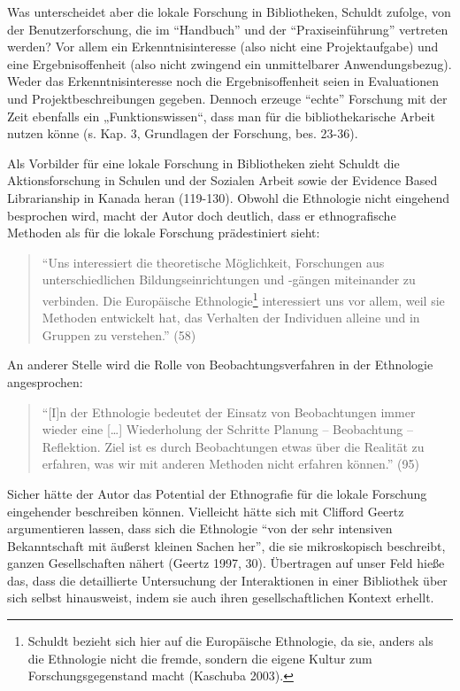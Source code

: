 \documentclass[a4paper,
fontsize=11pt,
oneside,
numbers=noperiodatend,
parskip=half-,
bibliography=totoc,
final
]{scrartcl}
\begin{document}
Was unterscheidet aber die lokale Forschung in Bibliotheken, Schuldt
zufolge, von der Benutzerforschung, die im \enquote{Handbuch} und der
\enquote{Praxiseinführung} vertreten werden? Vor allem ein
Erkenntnisinteresse (also nicht eine Projektaufgabe) und eine
Ergebnisoffenheit (also nicht zwingend ein unmittelbarer
Anwendungsbezug). Weder das Erkenntnisinteresse noch die
Ergebnisoffenheit seien in Evaluationen und Projektbeschreibungen
gegeben. Dennoch erzeuge \enquote{echte} Forschung mit der Zeit
ebenfalls ein „Funktionswissen``, dass man für die bibliothekarische
Arbeit nutzen könne (s. Kap. 3, Grundlagen der Forschung, bes. 23-36).

Als Vorbilder für eine lokale Forschung in Bibliotheken zieht Schuldt
die Aktionsforschung in Schulen und der Sozialen Arbeit sowie der
Evidence Based Librarianship in Kanada heran (119-130). Obwohl die
Ethnologie nicht eingehend besprochen wird, macht der Autor doch
deutlich, dass er ethnografische Methoden als für die lokale Forschung
prädestiniert sieht:

\begin{quote}
\enquote{Uns interessiert die theoretische Möglichkeit, Forschungen aus
unterschiedlichen Bildungseinrichtungen und -gängen miteinander zu
verbinden. Die Europäische Ethnologie\footnote{Schuldt bezieht sich hier
  auf die Europäische Ethnologie, da sie, anders als die Ethnologie
  nicht die fremde, sondern die eigene Kultur zum Forschungsgegenstand
  macht (Kaschuba 2003).} interessiert uns vor allem, weil sie Methoden
entwickelt hat, das Verhalten der Individuen alleine und in Gruppen zu
verstehen.} (58)
\end{quote}

An anderer Stelle wird die Rolle von Beobachtungsverfahren in der
Ethnologie angesprochen:

\begin{quote}
\enquote{{[}I{]}n der Ethnologie bedeutet der Einsatz von Beobachtungen
immer wieder eine {[}\ldots{}{]} Wiederholung der Schritte Planung --
Beobachtung -- Reflektion. Ziel ist es durch Beobachtungen etwas über
die Realität zu erfahren, was wir mit anderen Methoden nicht erfahren
können.} (95)
\end{quote}

Sicher hätte der Autor das Potential der Ethnografie für die lokale
Forschung eingehender beschreiben können. Vielleicht hätte sich mit
Clifford Geertz argumentieren lassen, dass sich die Ethnologie
\enquote{von der sehr intensiven Bekanntschaft mit äußerst kleinen
Sachen her}, die sie mikroskopisch beschreibt, ganzen Gesellschaften
nähert (Geertz 1997, 30). Übertragen auf unser Feld hieße das, dass die
detaillierte Untersuchung der Interaktionen in einer Bibliothek über
sich selbst hinausweist, indem sie auch ihren gesellschaftlichen Kontext
erhellt.
\end{document}
